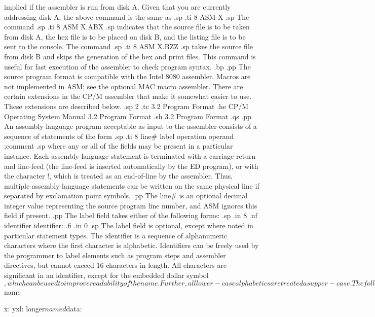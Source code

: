 implied if the assembler is run from disk A.  Given that you are 
currently addressing disk A, the above command is the same as
.sp
.ti 8
ASM X
.sp
The command
.sp
.ti 8
ASM X.ABX
.sp
indicates that the source file is to be taken from disk A, the 
hex file is to be placed on disk B, and the listing file is to be 
sent to the console.  The command
.sp
.ti 8
ASM X.BZZ
.sp
takes the source file from disk B and skips the generation of the 
hex and print files.  This command is useful for fast execution of 
the assembler to check program syntax.
.bp
.pp
The source program format is compatible with the Intel 8080 
assembler.  Macros are not implemented in ASM; see the optional 
MAC macro assembler.  There are certain extensions in the CP/M 
assembler that make it somewhat easier to use.  These extensions 
are described below.
.sp 2
.tc    3.2  Program Format
.he CP/M Operating System Manual                  3.2  Program Format
.sh
3.2  Program Format
.qs
.pp
An assembly-language program acceptable as input to the assembler 
consists of a sequence of statements of the form
.sp
.ti 8
line# label operation operand ;comment
.sp
where any or all of the fields may be present in a particular 
instance.  Each assembly-language statement is terminated with a 
carriage return and line-feed (the line-feed is inserted 
automatically by the ED program), or with the character !, which 
is treated as an end-of-line by the assembler.  Thus, multiple 
assembly-language statements can be written on the same physical 
line if separated by exclamation point symbols.
.pp
The line# is an optional decimal integer value representing the 
source program line number, and ASM ignores this field if 
present.
.pp
The label field takes either of the following forms:
.sp
.in 8
.nf
identifier
identifier:
.fi
.in 0
.sp
The label field is optional, except where noted in particular statement 
types.  The identifier is a sequence of alphanumeric characters 
where the first character is alphabetic.  Identifiers can be 
freely used by the programmer to label elements such as program 
steps and assembler directives, but cannot exceed 16 characters 
in length.  All characters are significant in an identifier, 
except for the embedded dollar symbol $, which can be used to 
improve readability of the name.  Further, all lower-case 
alphabetics are treated as upper-case.  The 
following are all valid instances of labels:
.sp 2
.nf
.in 8
x       xy      long$name

x:      yxl:    longer$named$data:

